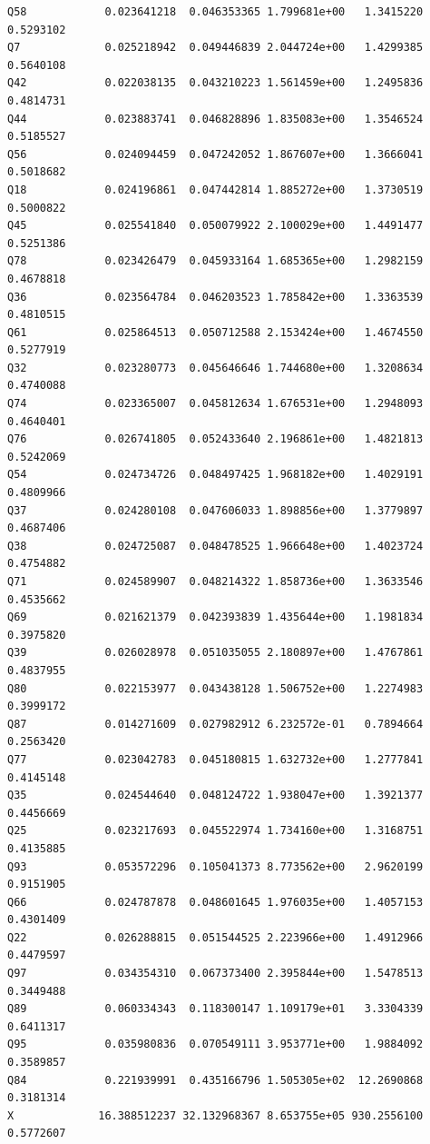\documentclass[
]{report}
\newenvironment{Shaded}{\begin{snugshade}}{\end{snugshade}}
\newcommand{\CommentTok}[1]{\textcolor[rgb]{0.56,0.35,0.01}{\textit{#1}}}
\newcommand{\FunctionTok}[1]{\textcolor[rgb]{0.00,0.00,0.00}{#1}}
\newcommand{\NormalTok}[1]{#1}
\newcommand{\SpecialCharTok}[1]{\textcolor[rgb]{0.00,0.00,0.00}{#1}}
\begin{document}
\begin{verbatim}
Q58            0.023641218  0.046353365 1.799681e+00   1.3415220 0.5293102
Q7             0.025218942  0.049446839 2.044724e+00   1.4299385 0.5640108
Q42            0.022038135  0.043210223 1.561459e+00   1.2495836 0.4814731
Q44            0.023883741  0.046828896 1.835083e+00   1.3546524 0.5185527
Q56            0.024094459  0.047242052 1.867607e+00   1.3666041 0.5018682
Q18            0.024196861  0.047442814 1.885272e+00   1.3730519 0.5000822
Q45            0.025541840  0.050079922 2.100029e+00   1.4491477 0.5251386
Q78            0.023426479  0.045933164 1.685365e+00   1.2982159 0.4678818
Q36            0.023564784  0.046203523 1.785842e+00   1.3363539 0.4810515
Q61            0.025864513  0.050712588 2.153424e+00   1.4674550 0.5277919
Q32            0.023280773  0.045646646 1.744680e+00   1.3208634 0.4740088
Q74            0.023365007  0.045812634 1.676531e+00   1.2948093 0.4640401
Q76            0.026741805  0.052433640 2.196861e+00   1.4821813 0.5242069
Q54            0.024734726  0.048497425 1.968182e+00   1.4029191 0.4809966
Q37            0.024280108  0.047606033 1.898856e+00   1.3779897 0.4687406
Q38            0.024725087  0.048478525 1.966648e+00   1.4023724 0.4754882
Q71            0.024589907  0.048214322 1.858736e+00   1.3633546 0.4535662
Q69            0.021621379  0.042393839 1.435644e+00   1.1981834 0.3975820
Q39            0.026028978  0.051035055 2.180897e+00   1.4767861 0.4837955
Q80            0.022153977  0.043438128 1.506752e+00   1.2274983 0.3999172
Q87            0.014271609  0.027982912 6.232572e-01   0.7894664 0.2563420
Q77            0.023042783  0.045180815 1.632732e+00   1.2777841 0.4145148
Q35            0.024544640  0.048124722 1.938047e+00   1.3921377 0.4456669
Q25            0.023217693  0.045522974 1.734160e+00   1.3168751 0.4135885
Q93            0.053572296  0.105041373 8.773562e+00   2.9620199 0.9151905
Q66            0.024787878  0.048601645 1.976035e+00   1.4057153 0.4301409
Q22            0.026288815  0.051544525 2.223966e+00   1.4912966 0.4479597
Q97            0.034354310  0.067373400 2.395844e+00   1.5478513 0.3449488
Q89            0.060334343  0.118300147 1.109179e+01   3.3304339 0.6411317
Q95            0.035980836  0.070549111 3.953771e+00   1.9884092 0.3589857
Q84            0.221939991  0.435166796 1.505305e+02  12.2690868 0.3181314
X             16.388512237 32.132968367 8.653755e+05 930.2556100 0.5772607
\end{verbatim}

\begin{Shaded}
\end{Shaded}
\end{document}
